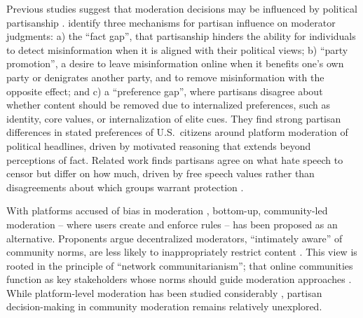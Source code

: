 \documentclass[12pt]{article}
\begin{document}
Previous studies suggest that moderation decisions may be influenced by political partisanship \parencite{lindnerAlienableSpeechIdeological2009,appelPartisanConflictContent2023a,kozyrevaResolvingContentModeration2023,solomonIllusoryInterpartyDisagreement2024}. \textcite{appelPartisanConflictContent2023a} identify three mechanisms for partisan influence on moderator judgments: a) the \enquote{fact gap}, that partisanship hinders the ability for individuals to detect misinformation when it is aligned with their political views; b) \enquote{party promotion}, a desire to leave misinformation online when it benefits one's own party or denigrates another party, and to remove misinformation with the opposite effect; and c) a \enquote{preference gap}, where partisans disagree about whether content should be removed due to internalized preferences, such as identity, core values, or internalization of elite cues. They find strong partisan differences in stated preferences of U.S.\ citizens around platform moderation of political headlines, driven by motivated reasoning that extends beyond perceptions of fact. Related work finds partisans agree on what hate speech to censor but differ on how much, driven by free speech values rather than disagreements about which groups warrant protection \parencite{solomonIllusoryInterpartyDisagreement2024}.

With platforms accused of bias in moderation \parencite{moslehDifferencesMisinformationSharing2024}, bottom-up, community-led moderation -- where users create and enforce rules \parencite{leibmannRedditRulesRulers2025} -- has been proposed as an alternative. Proponents argue decentralized moderators, \enquote{intimately aware} of community norms, are less likely to inappropriately restrict content \parencite{marrazzoFederalistsInternetWhat2023}. This view is rooted in the principle of \enquote{network communitarianism}; that online communities function as key stakeholders whose norms should guide moderation approaches \parencite{kozyrevaResolvingContentModeration2023}. While platform-level moderation has been studied considerably \parencite{chenNeutralBotsProbe2021,moslehDifferencesMisinformationSharing2024,hallinanblakeAspirationalPlatformGovernance2025}, partisan decision-making in community moderation remains relatively unexplored.
\end{document}
